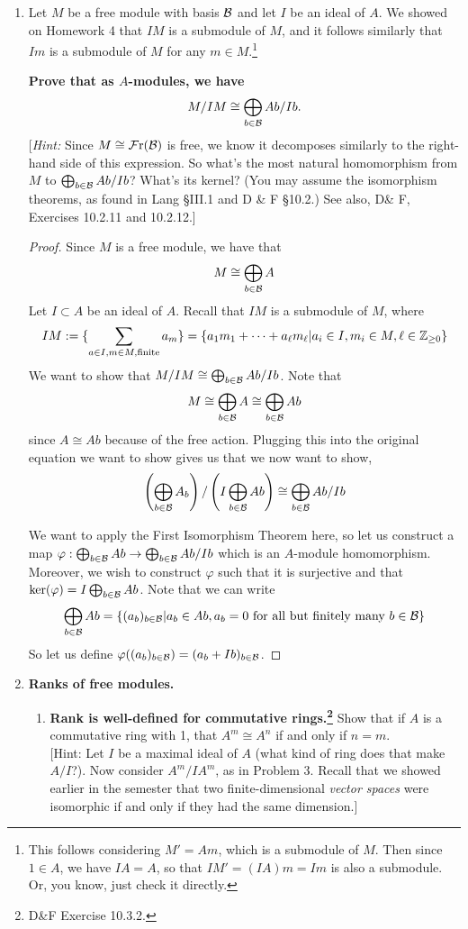 \documentclass[11pt, reqno]{amsart}
\theoremstyle{plain}
\theoremstyle{definition}
\theoremstyle{example}
\def\Fr{\mathcal{F}\mathrm{r}}
\begin{document}
\begin{enumerate}[1.]
\item Let $M$ be a free module with basis $\mathcal{B}$ and let $I$ be an ideal of $A$. We showed on Homework 4 that $IM$ is a submodule of $M$, and it follows similarly that $Im$ is a submodule of $M$ for any $m \in M$.\footnote{This follows considering $M' = Am$, which is a submodule of $M$. Then since $1 \in A$, we have $IA = A$, so that $IM' = (IA)m = Im$ is also a submodule. Or, you know, just check it directly.}

\textbf{Prove that as $A$-modules, we have 
$$M/IM \cong \bigoplus_{b \in \mathcal{B}} Ab/Ib.$$}
{[\emph{Hint:} Since $M \cong \Fr(\cB)$ is free, we know it decomposes similarly to the right-hand side of this expression. So what's the most natural homomorphism from $M$ to $\bigoplus_{b \in \mathcal{B}} Ab/Ib$? What's its kernel? (You may assume the isomorphism theorems, as found in Lang \S III.1 and D \& F \S 10.2.) See also, D\& F, Exercises 10.2.11 and 10.2.12.]}

\begin{proof}
Since $M$ is a free module, we have that $$M \cong \bigoplus_{b \in \mathcal{B}} A$$ Let $I \subset A$ be an ideal of $A$. Recall that $IM$ is a submodule of $M$, where $$IM := \{\sum_{a \in I, m \in M, \text{finite}} a_m\} = \{a_1m_1 + \cdots + a_{\ell}m_{\ell} | a_i \in I, m_i \in M, \ell \in \mathbb{Z}_{\geq 0}\}$$ We want to show that $M/IM \cong \bigoplus_{b \in \mathcal{B}} Ab/Ib$. Note that $$M \cong \bigoplus_{b \in \mathcal{B}} A \cong \bigoplus_{b \in \mathcal{B}} Ab$$ since $A \cong Ab$ because of the free action. Plugging this into the original equation we want to show gives us that we now want to show,
\begin{align*}
\left(\bigoplus_{b \in \mathcal{B}} A_b \right)/\left(I \bigoplus_{b \in \mathcal{B}} Ab \right) \cong \bigoplus_{b \in \mathcal{B}} Ab/Ib
\end{align*}

We want to apply the First Isomorphism Theorem here, so let us construct a map $\varphi: \bigoplus_{b \in \mathcal{B}} Ab \to \bigoplus_{b \in \mathcal{B}} Ab/Ib$ which is an $A$-module homomorphism. Moreover, we wish to construct $\varphi$ such that it is surjective and that $\ker(\varphi) = I \bigoplus_{b \in \mathcal{B}} Ab$. Note that we can write $$\bigoplus_{b \in \mathcal{B}} Ab = \{(a_b)_{b \in \mathcal{B}} | a_b \in Ab, a_b = 0 \text{ for all but finitely many } b \in \mathcal{B}\}$$ So let us define $\varphi((a_b)_{b \in \mathcal{B}}) = (a_b + Ib)_{b \in \mathcal{B}}$.


\end{proof}

\item  \textbf{Ranks of free modules.}
\begin{enumerate}
\item \textbf{Rank is well-defined for commutative rings.\footnote{D\&F Exercise 10.3.2.} } Show that if $A$ is a commutative ring with 1, that $A^m \cong A^n$ if and only if $n=m$.\\
{[Hint: Let $I$ be a maximal ideal of $A$ (what kind of ring does that make $A/I$?). Now consider $A^m/IA^m$, as in Problem 3. Recall that we showed earlier in the semester that two finite-dimensional \emph{vector spaces} were isomorphic if and only if they had the same dimension.]}


\end{enumerate}
\end{enumerate}
\end{document}
